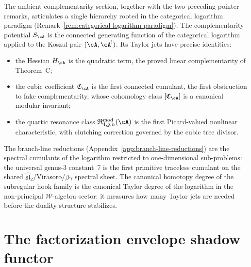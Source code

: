 \begin{remark}
\label{rem:categorical-logarithm-jets}
The ambient complementarity section, together with the two preceding
pointer remarks, articulates a single hierarchy rooted in the
categorical logarithm paradigm
(Remark~\ref{rem:categorical-logarithm-paradigm}). The
complementarity potential $S_\cA$ is the connected generating
function of the categorical logarithm applied to the Koszul pair
$(\cA,\cA^!)$. Its Taylor jets have precise identities:
\begin{itemize}
\item the Hessian $H_\cA$ is the quadratic term, the proved linear
 complementarity of Theorem~C;
\item the cubic coefficient $\mathfrak C_\cA$ is the first connected
 cumulant, the first obstruction to fake complementarity, whose
 cohomology class $[\mathfrak C_\cA]$ is a canonical modular
 invariant;
\item the quartic resonance class
 $\mathfrak R_{4,g,n}^{\mathrm{mod}}(\cA)$ is the first
 Picard-valued nonlinear characteristic, with clutching correction
 governed by the cubic tree divisor.
\end{itemize}
The branch-line reductions
(Appendix~\ref{app:branch-line-reductions}) are the spectral
cumulants of the logarithm restricted to one-dimensional
sub-problems: the universal genus-$3$ constant~$7$ is the first
primitive traceless cumulant on the shared
$\widehat{\mathfrak{sl}}_2$/Virasoro/$\beta\gamma$ spectral sheet.
The canonical homotopy degree of the subregular hook family
is the canonical
Taylor degree of the logarithm in the non-principal
$\mathcal W$-algebra sector: it measures how many Taylor jets are
needed before the duality structure stabilizes.
\end{remark}



\section{The factorization envelope shadow functor}
\label{sec:envelope-shadow-functor}


